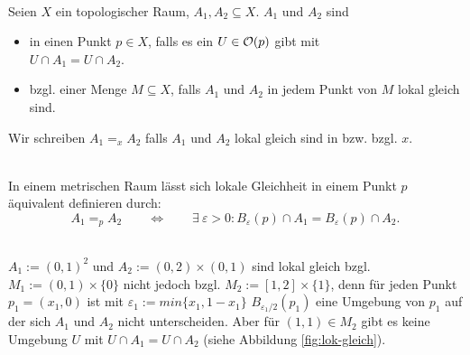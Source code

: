 
    \begin{dfn}\label{def:lok-gleich}\ \\
        Seien $X$ ein topologischer Raum, $A_1, A_2 \subseteq X$.
        $A_1$ und $A_2$ sind  
        \begin{itemize}
            \item in einen Punkt ${p \in X}$, falls es ein ${U \in \mathcal{O}(p)}$ gibt mit \\
            ${U \cap A_1 = U \cap A_2}$.
            \item bzgl. einer Menge $M \subseteq X$, falls $A_1$ und $A_2$ in jedem Punkt von $M$ lokal gleich sind.
        \end{itemize}
        Wir schreiben ${A_1 =_x A_2}$ falls $A_1$ und $A_2$ lokal gleich sind in bzw. bzgl. $x$.
    \end{dfn}
    
    \begin{bem}\ \\
     In einem metrischen Raum lässt sich lokale Gleichheit in einem Punkt $p$ äquivalent definieren durch:
     $$ A_1 =_p A_2 \quad \quad \Leftrightarrow \quad \quad \exists\: \varepsilon > 0 : B_\varepsilon(p) \cap A_1 = B_\varepsilon(p) \cap A_2.$$
    \end{bem}
    
    \begin{bsp}\label{bsp:lok-gleich}\ \\
     $A_1 := (0,1)^2$ und $A_2 := (0,2) \times (0,1)$ sind lokal gleich bzgl. $M_1 := (0,1) \times \{0\}$ nicht jedoch bzgl. $M_2 := [1,2] \times \{1\}$, denn für jeden Punkt $p_1 = (x_1,0)$ ist mit $\varepsilon_1 := min\{x_1,1-x_1\}$ $B_{\varepsilon_1/2}(p_1)$ eine Umgebung von $p_1$ auf der sich $A_1$ und $A_2$ nicht unterscheiden.
     Aber für $(1,1) \in M_2$ gibt es keine Umgebung $U$ mit $U \cap A_1 = U \cap A_2$ (siehe Abbildung \ref{fig:lok-gleich}).
    \end{bsp}
    
